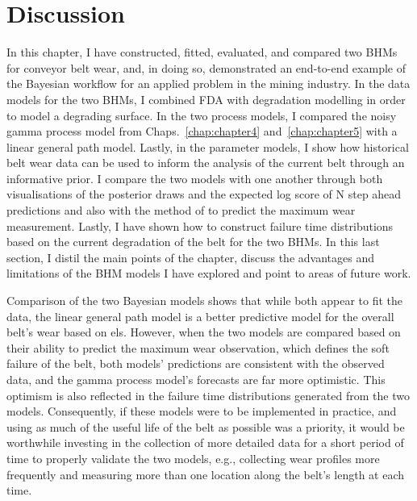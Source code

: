 \section{Discussion} \label{sec:belt-wear-discussion}

In this chapter, I have constructed, fitted, evaluated, and compared two BHMs for conveyor belt wear, and, in doing so, demonstrated an end-to-end example of the Bayesian workflow for an applied problem in the mining industry. In the data models for the two BHMs, I combined FDA with degradation modelling in order to model a degrading surface. In the two process models, I compared the noisy gamma process model from Chaps.~\ref{chap:chapter4} and~\ref{chap:chapter5} with a linear general path model. Lastly, in the parameter models, I show how historical belt wear data can be used to inform the analysis of the current belt through an informative prior. I compare the two models with one another through both visualisations of the posterior draws and the expected log score of N step ahead predictions and also with the method of \cite{webb_2020} to predict the maximum wear measurement. Lastly, I have shown how to construct failure time distributions based on the current degradation of the belt for the two BHMs. In this last section, I distil the main points of the chapter, discuss the advantages and limitations of the BHM models I have explored and point to areas of future work.

Comparison of the two Bayesian models shows that while both appear to fit the data, the linear general path model is a better predictive model for the overall belt's wear based on els. However, when the two models are compared based on their ability to predict the maximum wear observation, which defines the soft failure of the belt, both models' predictions are consistent with the observed data, and the gamma process model's forecasts are far more optimistic. This optimism is also reflected in the failure time distributions generated from the two models. Consequently, if these models were to be implemented in practice, and using as much of the useful life of the belt as possible was a priority, it would be worthwhile investing in the collection of more detailed data for a short period of time to properly validate the two models, e.g., collecting wear profiles more frequently and measuring more than one location along the belt's length at each time.

